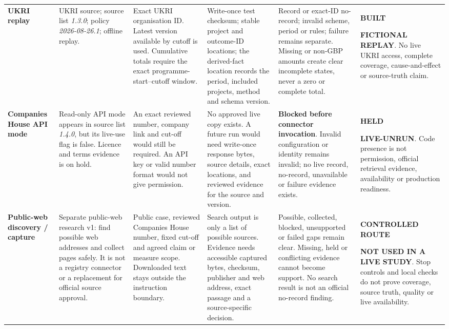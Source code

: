 \begin{table}[p]
\begin{tabularx}{\textwidth}{@{}P{0.105\textwidth}P{0.135\textwidth}P{0.17\textwidth}P{0.17\textwidth}P{0.175\textwidth}Y@{}}
    \addlinespace[1.5pt]
    \textbf{UKRI replay} &
    UKRI source; source list \emph{1.3.0}; policy \emph{2026-08-26.1}; offline replay. &
    Exact UKRI organisation ID. Latest version available by cutoff is used. Cumulative totals require the exact programme-start--cutoff window. &
    Write-once test checksum; stable project and outcome-ID locations; the derived-fact location records the period, included projects, method and schema version. &
    Record or exact-ID no-record; invalid scheme, period or rules; failure remains separate. Missing or non-GBP amounts create clear incomplete states, never a zero or complete total. &
    \textbf{BUILT}\par\textbf{FICTIONAL REPLAY}. No live UKRI access, complete coverage, cause-and-effect or source-truth claim. \\

    \addlinespace[1.5pt]
    \textbf{Companies House API mode} &
    Read-only API mode appears in source list \emph{1.4.0}, but its live-use flag is false. Licence and terms evidence is on hold. &
    An exact reviewed number, company link and cut-off would still be required. An API key or valid number format would not give permission. &
    No approved live copy exists. A future run would need write-once response bytes, source details, exact locations, and reviewed evidence for the source and version. &
    \textbf{Blocked before connector invocation}. Invalid configuration or identity remains invalid; no live record, no-record, unavailable or failure evidence exists. &
    \textbf{HELD}\par\textbf{LIVE-UNRUN}. Code presence is not permission, official retrieval evidence, availability or production readiness. \\

    \addlinespace[1.5pt]
    \textbf{Public-web discovery / capture} &
    Separate public-web research v1: find possible web addresses and collect pages safely. It is not a registry connector or a replacement for official source approval. &
    Public case, reviewed Companies House number, fixed cut-off and agreed claim or measure scope. Downloaded text stays outside the instruction boundary. &
    Search output is only a list of possible sources. Evidence needs accessible captured bytes, checksum, publisher and web address, exact passage and a source-specific decision. &
    Possible, collected, blocked, unsupported or failed gaps remain clear. Missing, held or conflicting evidence cannot become support. No search result is not an official no-record finding. &
    \textbf{CONTROLLED ROUTE}\par\textbf{NOT USED IN A LIVE STUDY}. Stop controls and local checks do not prove coverage, source truth, quality or live availability. \\
    \bottomrule
  \end{tabularx}


\end{table}
